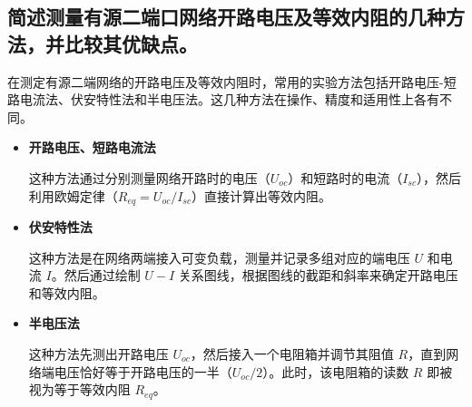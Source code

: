 \documentclass{Report} %
\begin{document}
\subsection{简述测量有源二端口网络开路电压及等效内阻的几种方法，并比较其优缺点。}
在测定有源二端网络的开路电压及等效内阻时，常用的实验方法包括开路电压-短路电流法、伏安特性法和半电压法。这几种方法在操作、精度和适用性上各有不同。
\begin{itemize}
    \item \textbf{开路电压、短路电流法}

    这种方法通过分别测量网络开路时的电压（$U_{oc}$）和短路时的电流（$I_{sc}$），然后利用欧姆定律（$R_{eq} = U_{oc} / I_{sc}$）直接计算出等效内阻。

    \item \textbf{伏安特性法}

    这种方法是在网络两端接入可变负载，测量并记录多组对应的端电压 $U$ 和电流 $I$。然后通过绘制 $U-I$ 关系图线，根据图线的截距和斜率来确定开路电压和等效内阻。


    \item \textbf{半电压法}

    这种方法先测出开路电压 $U_{oc}$，然后接入一个电阻箱并调节其阻值 $R$，直到网络端电压恰好等于开路电压的一半（$U_{oc} / 2$）。此时，该电阻箱的读数 $R$ 即被视为等于等效内阻 $R_{eq}$。
\end{itemize}
\end{document}

